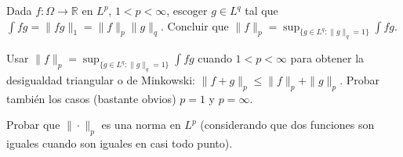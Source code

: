 
\begin{problem}[6] Dada $f:\Omega\to \mathbb{R}$ en $L^p$,  $1 < p <  \infty$, escoger $g\in L^q$ tal que
$\int fg = \|fg\|_1 = \|f\|_p\|g\|_q$. Concluir que 
$\|f\|_p= \operatorname{sup}_{\{g\in L^q: \|g\|_q=1\}} \int fg $.
\solution

\begin{expla}

\end{expla}

\end{problem}


\begin{problem}[7]Usar $\|f\|_p= \operatorname{sup}_{\{g\in L^q: \|g\|_q=1\}} \int fg $ cuando $1 < p <  \infty$
para obtener la desigualdad triangular o de Minkowski: $\|f + g\|_p \le \|f\|_p + \|g\|_p$.
Probar tambi\'en los casos (bastante obvios) $p=1$  y  $p = \infty$.
\solution

\begin{expla}

\end{expla}

\end{problem}


\begin{problem}[8]Probar que $\|\cdot\|_p$ es una norma en $L^p$ (considerando que dos funciones
son iguales
cuando son iguales en casi todo punto).
\solution

\begin{expla}

\end{expla}

\end{problem}


